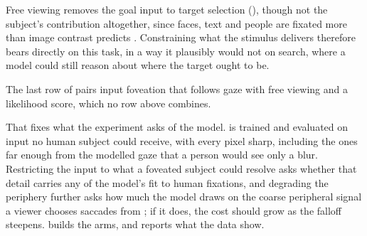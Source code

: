 Free viewing removes the goal input to target selection (), though not the subject's
contribution altogether, since faces, text and people are fixated more than image contrast predicts
\citep{judd2009mit1003}. Constraining what the stimulus delivers therefore bears directly on this task,
in a way it plausibly would not on search, where a model could still reason about where the target ought
to be.

The last row of  pairs input foveation that follows gaze with free viewing
and a likelihood score, which no row above combines.

That fixes what the experiment asks of the model. \dg{} is trained and evaluated on input no human
subject could receive, with every pixel sharp, including the ones far enough from the modelled gaze that a
person would see only a blur. Restricting the input to what a foveated subject could resolve asks
whether that detail carries any of the model's fit to human fixations, and degrading the periphery
further asks how much the model draws on the coarse peripheral signal a viewer chooses saccades from
\citep{najemnik2005}; if it does, the cost should grow as the falloff steepens.  builds
the arms, and  reports what the data show.
